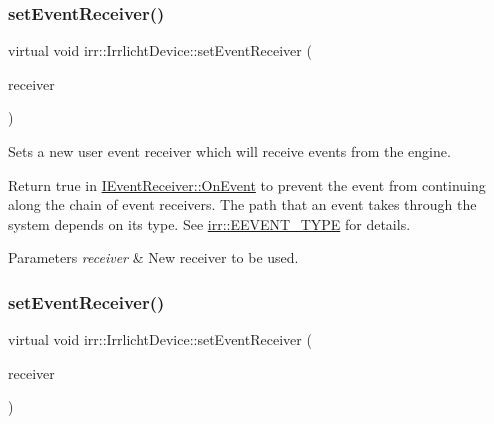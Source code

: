 \subsubsection{\texorpdfstring{set\+Event\+Receiver()}{setEventReceiver()}\hspace{0.1cm}{\footnotesize\ttfamily [1/2]}}
{\footnotesize\ttfamily virtual void irr\+::\+Irrlicht\+Device\+::set\+Event\+Receiver (\begin{DoxyParamCaption}\item[{\hyperlink{classirr_1_1IEventReceiver}{I\+Event\+Receiver} $\ast$}]{receiver }\end{DoxyParamCaption})\hspace{0.3cm}{\ttfamily [pure virtual]}}



Sets a new user event receiver which will receive events from the engine. 

Return true in \hyperlink{classirr_1_1IEventReceiver_a571f744ceffc3b4fe8a81f529163eb97}{I\+Event\+Receiver\+::\+On\+Event} to prevent the event from continuing along the chain of event receivers. The path that an event takes through the system depends on its type. See \hyperlink{namespaceirr_ac9eed96e06e85ce3c86fcbbbe9e48a0c}{irr\+::\+E\+E\+V\+E\+N\+T\+\_\+\+T\+Y\+PE} for details. 
\begin{DoxyParams}{Parameters}
{\em receiver} & New receiver to be used. \\
\hline
\end{DoxyParams}
\mbox{\label{classirr_1_1IrrlichtDevice_abf71a5ed6bb6b287e769f699010cedf0}} 
\subsubsection{\texorpdfstring{set\+Event\+Receiver()}{setEventReceiver()}\hspace{0.1cm}{\footnotesize\ttfamily [2/2]}}
{\footnotesize\ttfamily virtual void irr\+::\+Irrlicht\+Device\+::set\+Event\+Receiver (\begin{DoxyParamCaption}\item[{\hyperlink{classirr_1_1IEventReceiver}{I\+Event\+Receiver} $\ast$}]{receiver }\end{DoxyParamCaption})\hspace{0.3cm}{\ttfamily [pure virtual]}}




